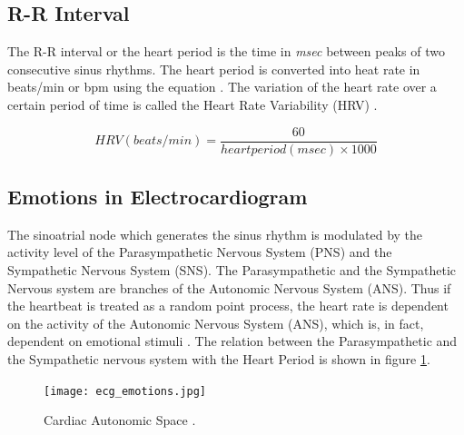 \subsection{R-R Interval}
\label{sec:rrinterval}
The R-R interval or the heart period is the time in \textit{msec} between peaks of two consecutive sinus rhythms. The heart period is converted into heat rate in beats/min or bpm using the equation \cite{cacioppo_cardiovascular_2016_p_183_216}. The variation of the heart rate over a certain period of time is called the Heart Rate Variability (HRV) \cite{noauthor_what_2017}.

\begin{equation}
\label{eq:hrv}
    HRV(beats/min) = \frac{60}{heart period (msec) \times 1000}
\end{equation}

\subsection{Emotions in Electrocardiogram}
The sinoatrial node which generates the sinus rhythm is modulated by the activity level of the Parasympathetic Nervous System (PNS) and the Sympathetic Nervous System (SNS). The Parasympathetic and the Sympathetic Nervous system are branches of the Autonomic Nervous System (ANS). Thus if the heartbeat is treated as a random point process, the heart rate is dependent on the activity of the Autonomic Nervous System (ANS), which is, in fact, dependent on emotional stimuli \cite{kim_emotion_2004}. The relation between the Parasympathetic and the Sympathetic nervous system with the Heart Period is shown in figure \ref{fig:ecg_emotions}.

\begin{figure}
    \centering
    \texttt{[image: ecg\_emotions.jpg]}
    \caption{Cardiac Autonomic Space \cite{cacioppo_cardiovascular_2016_p_183_216}.}
    \label{fig:ecg_emotions}
\end{figure}

